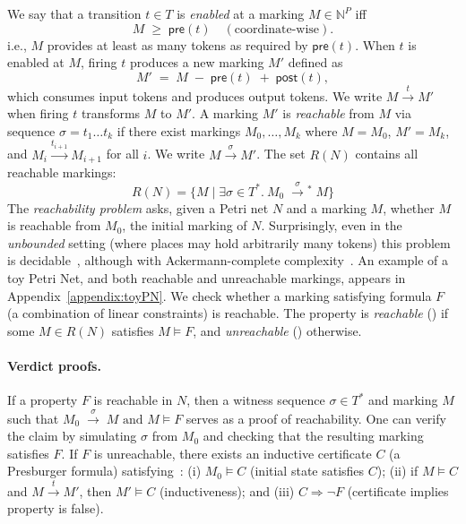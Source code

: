 \noindent We say that a transition \(t\in T\) is \emph{enabled} at a marking \(M\in\mathbb N^P\) iff
\[
M \;\ge\; \mathsf{pre}(t)
\quad(\text{coordinate‐wise}).
\]
i.e., $M$ provides at least as many tokens as required by $\mathsf{pre}(t)$.
When $t$ is enabled at $M$, firing $t$ produces a new marking $M'$ defined as
\[
M' \;=\; M \;-\;\mathsf{pre}(t)\;+\;\mathsf{post}(t),
\]
which consumes input tokens and produces output tokens. We write $M \xrightarrow{t} M'$ when firing $t$ transforms $M$ to $M'$.
%
A marking \(M'\) is \emph{reachable} from $M$ via sequence $\sigma = t_1 \ldots t_k$ if there exist markings $M_0, \ldots, M_k$ where $M = M_0$, $M' = M_k$, and $M_i \xrightarrow{t_{i+1}} M_{i+1}$ for all $i$. We write $M \xrightarrow{\sigma} M'$.
The set $R(N)$ contains all reachable markings:
\[
R(N) = \{M \mid \exists \sigma \in T^* .\ M_0 \;\xrightarrow{\sigma}\!^*\; M\}
\]
%
The \emph{reachability problem} asks, given a Petri net $N$ and a marking $M$, whether $M$ is reachable from $M_0$, the initial marking of $N$.  Surprisingly, even in the
\emph{unbounded} setting (where places may hold arbitrarily many tokens) this problem is
decidable~\cite{Ma81,Ko82,La92}, although with
Ackermann-complete complexity~\cite{CzWo22,Le22}.
%
An example of a toy Petri Net, and both reachable and unreachable markings, appears in Appendix~\ref{appendix:toyPN}.
%
We check whether a marking satisfying formula $F$ (a combination of linear constraints) is reachable. The property is \textit{reachable} (\sat) if some $M \in R(N)$ satisfies $M \models F$, and \textit{unreachable} (\unsat) otherwise. 

\paragraph{Verdict proofs.} 

If a property $F$ is reachable in $N$, then a witness sequence $\sigma \in T^*$ and marking $M$ such that $ M_0 \;\xrightarrow{\sigma}\; M \text{ and }M \models F$
serves as a proof of reachability. One can verify the claim by simulating $\sigma$ from $M_0$ and checking that the resulting marking satisfies $F$.
%
If $F$ is unreachable, there exists an inductive certificate $C$ (a Presburger formula) satisfying~\cite{Le09}:
(i) $M_0 \models C$ (initial state satisfies $C$);
(ii) if $M \models C$ and $M \xrightarrow{t} M'$, then $M' \models C$ (inductiveness); and
(iii) $C \Rightarrow \neg F$ (certificate implies property is false).

